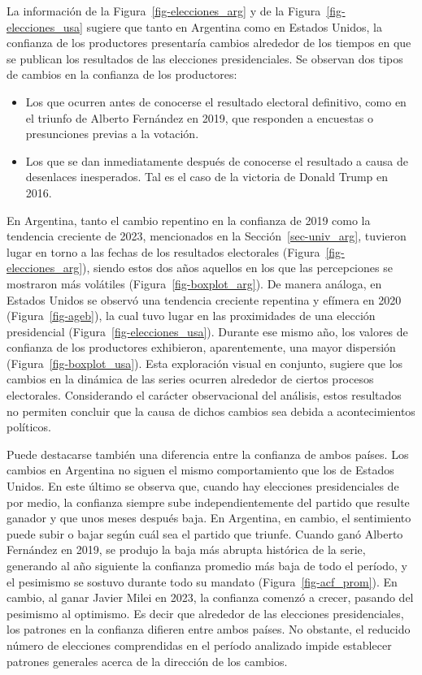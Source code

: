 \documentclass[12pt]{article}
\providecommand{\tightlist}{%
  \setlength{\itemsep}{0pt}\setlength{\parskip}{0pt}}\usepackage{longtable,booktabs,array}
\begin{document}
La información de la Figura~\ref{fig-elecciones_arg} y de la
Figura~\ref{fig-elecciones_usa} sugiere que tanto en Argentina como en
Estados Unidos, la confianza de los productores presentaría cambios
alrededor de los tiempos en que se publican los resultados de las
elecciones presidenciales. Se observan dos tipos de cambios en la
confianza de los productores:

\begin{itemize}
\tightlist
\item
  Los que ocurren antes de conocerse el resultado electoral definitivo,
  como en el triunfo de Alberto Fernández en 2019, que responden a
  encuestas o presunciones previas a la votación.
\item
  Los que se dan inmediatamente después de conocerse el resultado a
  causa de desenlaces inesperados. Tal es el caso de la victoria de
  Donald Trump en 2016.
\end{itemize}

En Argentina, tanto el cambio repentino en la confianza de 2019 como la
tendencia creciente de 2023, mencionados en la
Sección~\ref{sec-univ_arg}, tuvieron lugar en torno a las fechas de los
resultados electorales (Figura~\ref{fig-elecciones_arg}), siendo estos
dos años aquellos en los que las percepciones se mostraron más volátiles
(Figura~\ref{fig-boxplot_arg}). De manera análoga, en Estados Unidos se
observó una tendencia creciente repentina y efímera en 2020
(Figura~\ref{fig-ageb}), la cual tuvo lugar en las proximidades de una
elección presidencial (Figura~\ref{fig-elecciones_usa}). Durante ese
mismo año, los valores de confianza de los productores exhibieron,
aparentemente, una mayor dispersión (Figura~\ref{fig-boxplot_usa}). Esta
exploración visual en conjunto, sugiere que los cambios en la dinámica
de las series ocurren alrededor de ciertos procesos electorales.
Considerando el carácter observacional del análisis, estos resultados no
permiten concluir que la causa de dichos cambios sea debida a
acontecimientos políticos.

Puede destacarse también una diferencia entre la confianza de ambos
países. Los cambios en Argentina no siguen el mismo comportamiento que
los de Estados Unidos. En este último se observa que, cuando hay
elecciones presidenciales de por medio, la confianza siempre sube
independientemente del partido que resulte ganador y que unos meses
después baja. En Argentina, en cambio, el sentimiento puede subir o
bajar según cuál sea el partido que triunfe. Cuando ganó Alberto
Fernández en 2019, se produjo la baja más abrupta histórica de la serie,
generando al año siguiente la confianza promedio más baja de todo el
período, y el pesimismo se sostuvo durante todo su mandato
(Figura~\ref{fig-acf_prom}). En cambio, al ganar Javier Milei en 2023,
la confianza comenzó a crecer, pasando del pesimismo al optimismo. Es
decir que alrededor de las elecciones presidenciales, los patrones en la
confianza difieren entre ambos países. No obstante, el reducido número
de elecciones comprendidas en el período analizado impide establecer
patrones generales acerca de la dirección de los cambios.
\end{document}
